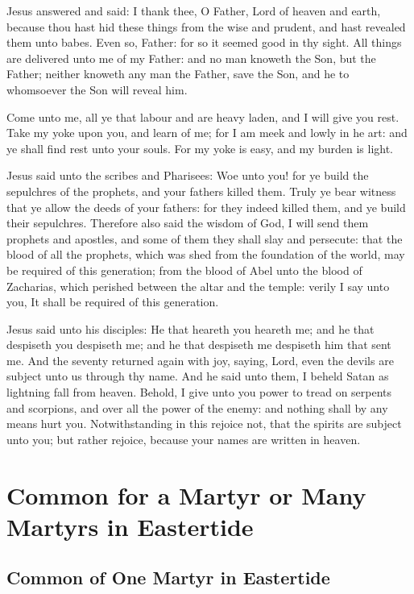  Jesus answered and said: I thank thee, O Father, Lord of heaven and earth, because thou hast hid these things from the wise and prudent, and hast revealed them unto babes. Even so, Father: for so it seemed good in thy sight. All things are delivered unto me of my Father: and no man knoweth the Son, but the Father; neither knoweth any man the Father, save the Son, and he to whomsoever the Son will reveal him.

Come unto me, all ye that labour and are heavy laden, and I will give you rest. Take my yoke upon you, and learn of me; for I am meek and lowly in he art: and ye shall find rest unto your souls. For my yoke is easy, and my burden is light.

\label{Luke1147}
 Jesus said unto the scribes and Pharisees: Woe unto you! for ye build the sepulchres of the prophets, and your fathers killed them. Truly ye bear witness that ye allow the deeds of your fathers: for they indeed killed them, and ye build their sepulchres. Therefore also said the wisdom of God, I will send them prophets and apostles, and some of them they shall slay and persecute: that the blood of all the prophets, which was shed from the foundation of the world, may be required of this generation; from the blood of Abel unto the blood of Zacharias, which perished between the altar and the temple: verily I say unto you, It shall be required of this generation.

\label{Luke1016}
 Jesus said unto his disciples: He that heareth you heareth me; and he that despiseth you despiseth me; and he that despiseth me despiseth him that sent me. And the seventy returned again with joy, saying, Lord, even the devils are subject unto us through thy name. And he said unto them, I beheld Satan as lightning fall from heaven. Behold, I give unto you power to tread on serpents and scorpions, and over all the power of the enemy: and nothing shall by any means hurt you. Notwithstanding in this rejoice not, that the spirits are subject unto you; but rather rejoice, because your names are written in heaven.

\section{Common for a Martyr or Many Martyrs in Eastertide}

\subsection{Common of One Martyr in Eastertide}\label{CommonMartyrEaster}

